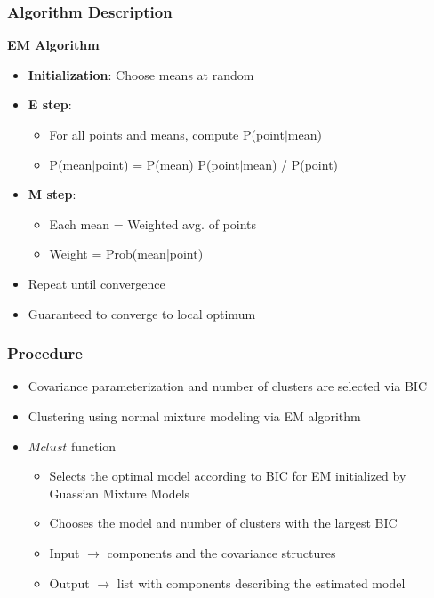 \documentclass{beamer}
\begin{document}
\begin{frame}
\frametitle{Algorithm Description}
\textbf{EM Algorithm}
\begin{center}
  \begin{itemize}
  \item \textbf{Initialization}: Choose means at random
\item \textbf{E step}:
\begin{itemize}
\item For all points and means, compute P(point$|$mean)
\item P(mean$|$point) = P(mean) P(point$|$mean) / P(point)
\end{itemize}
\item \textbf{M step}:
\begin{itemize}
\item Each mean = Weighted avg. of points
\item Weight = Prob(mean|point)
\end{itemize}
\item Repeat until convergence
\item Guaranteed to converge to local optimum
\end{itemize}
\end{center}
\end{frame}


\begin{frame}
\frametitle{Procedure}
\begin{center}
\begin{itemize}
\item Covariance parameterization and number of clusters are selected via BIC
\item Clustering using normal mixture modeling via EM algorithm
\item $Mclust$ function 
\begin{itemize}
\item Selects the optimal model according to BIC for EM initialized by Guassian Mixture Models
\item Chooses the model and number of clusters with the largest BIC
\item Input $\rightarrow$ components and the covariance structures
\item Output $\rightarrow$ list with components describing the estimated model
\end{itemize}
\end{itemize}
  
\end{center}
\end{frame}
\end{document}
